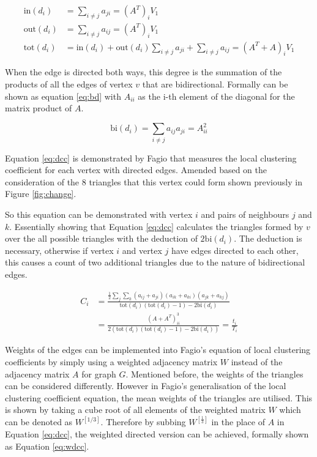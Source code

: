 \begin{align} \label{eq:idod}
\text{in}(d_i) &= \sum_{i\neq j}a_{ji} = (A^T)_i V_1 \\
\text{out}(d_i) &= \sum_{i\neq j}a_{ij} = (A^T)_i V_1 \nonumber \\
\text{tot}(d_i) &= \text{in}(d_i) + \text{out}(d_i) \sum_{i\neq j}a_{ji} + \sum_{i\neq j}a_{ij} = (A^T + A)_i V_1 \nonumber
\end{align}

When the edge is directed both ways, this degree is the summation of the products of all the edges of vertex $v$ that are bidirectional. Formally can be shown as equation \ref{eq:bd} with $A_{ii}$ as the i-th element of the diagonal for the matrix product of $A$.

\begin{equation} \label{eq:bd}
\text{bi}(d_i) = \sum_{i\neq j}a_{ij}a_{ji} = A_{ii}^2 
\end{equation}
 
Equation \ref{eq:dcc} is demonstrated by Fagio \cite{Fagiolo_2007} that measures the local clustering coefficient for each vertex with directed edges. Amended based on the consideration of the 8 triangles that this vertex could form shown previously in Figure \ref{fig:change}. 

So this equation can be demonstrated with vertex $i$ and pairs of neighbours $j$ and $k$. Essentially showing that Equation \ref{eq:dcc} calculates the triangles formed by $v$ over the all possible triangles with the deduction of $2\text{bi}(d_i)$. The deduction is necessary, otherwise if vertex $i$ and vertex $j$ have edges directed to each other, this causes a count of two additional triangles due to the nature of bidirectional edges.

\begin{align} \label{eq:dcc}
C_i &= \frac{\frac{1}{2}\sum_j \sum_k (a_{ij} + a_{ji})(a_{ik} + a_{ki})(a_{jk} + a_{kj})}{\text{tot}(d_i)(\text{tot}(d_i) - 1) - 2\text{bi}(d_i)} \\
&= \frac{(A + A^T)^3_{ii}}{2(\text{tot}(d_i)(\text{tot}(d_i) - 1) - 2\text{bi}(d_i))} = \frac{t_i}{T_i} \nonumber
\end{align}

Weights of the edges can be implemented into Fagio's equation of local clustering coefficients by simply using a weighted adjacency matrix $W$ instead of the adjacency matrix $A$ for graph $G$. Mentioned before, the weights of the triangles can be considered differently. However in Fagio's generalisation of the local clustering coefficient equation, the mean weights of the triangles are utilised. This is shown by taking a cube root of all elements of the weighted matrix $W$ which can be denoted as $W^{[1/3]}$. Therefore by subbing $W^{[\frac{1}{3}]}$ in the place of $A$ in Equation \ref{eq:dcc}, the weighted directed version can be achieved, formally shown as Equation \ref{eq:wdcc}.


